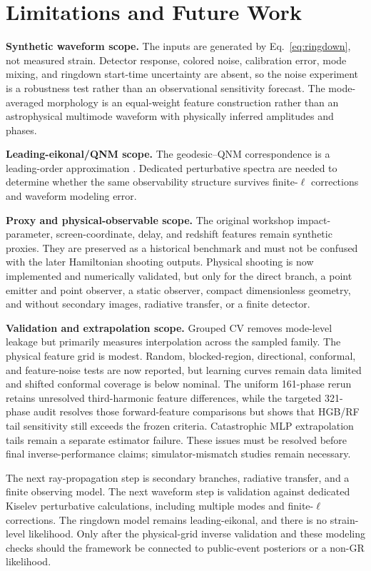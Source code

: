 \documentclass[conference]{IEEEtran}
\begin{document}
\raggedbottom
\FloatBarrier
\section{Limitations and Future Work}
\textbf{Synthetic waveform scope.} The inputs are generated by
Eq.~\eqref{eq:ringdown}, not measured strain. Detector response, colored noise,
calibration error, mode mixing, and ringdown start-time uncertainty are absent,
so the noise experiment is a robustness test rather than an observational
sensitivity forecast. The mode-averaged morphology is an equal-weight feature
construction rather than an astrophysical multimode waveform with physically
inferred amplitudes and phases.

\textbf{Leading-eikonal/QNM scope.} The geodesic--QNM correspondence is a
leading-order approximation \cite{cardoso2009geodesic}. Dedicated perturbative
spectra are needed to determine whether the same observability structure
survives finite-$\ell$ corrections and waveform modeling error.

\textbf{Proxy and physical-observable scope.} The original workshop
impact-parameter, screen-coordinate, delay, and redshift features remain
synthetic proxies. They are preserved as a historical benchmark and must not be
confused with the later Hamiltonian shooting outputs. Physical shooting is now
implemented and numerically validated, but only for the direct branch, a point
emitter and point observer, a static observer, compact dimensionless geometry,
and without secondary images, radiative transfer, or a finite detector.

\textbf{Validation and extrapolation scope.} Grouped CV removes mode-level
leakage but primarily measures interpolation across the sampled family. The
physical feature grid is modest. Random, blocked-region, directional,
conformal, and feature-noise tests are now reported, but learning curves remain
data limited and shifted conformal coverage is below nominal. The uniform
161-phase rerun retains unresolved third-harmonic feature differences, while
the targeted 321-phase audit resolves those forward-feature comparisons but
shows that HGB/RF tail sensitivity still exceeds the frozen criteria.
Catastrophic MLP extrapolation tails remain a separate estimator failure. These
issues must be resolved before final inverse-performance claims;
simulator-mismatch studies remain necessary.

The next ray-propagation step is secondary branches, radiative transfer, and a
finite observing model. The next waveform step is validation against dedicated
Kiselev perturbative calculations, including multiple modes and finite-$\ell$
corrections. The ringdown model remains leading-eikonal, and there is no
strain-level likelihood. Only after the physical-grid inverse validation and
these modeling checks should the framework be connected to public-event
posteriors or a non-GR likelihood.
\end{document}
